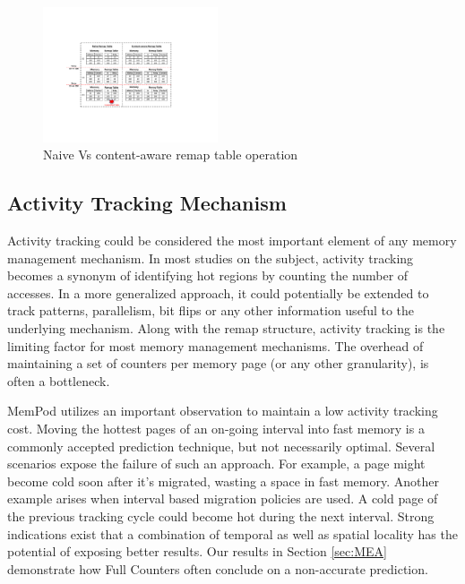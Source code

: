 \begin{figure}[h]
  \includegraphics[width=0.46\textwidth]{figures/remap_table_design.pdf}
  \caption{Naive Vs content-aware remap table operation}
  \label{fig:remap_table_comparison}
\end{figure}

%


\subsection{Activity Tracking Mechanism}
\label{sec:tracking}

Activity tracking could be considered the most important element of any memory management mechanism. In most studies on the subject, activity tracking becomes a synonym of identifying hot regions by counting the number of accesses. In a more generalized approach, it could potentially be extended to track patterns, parallelism, bit flips or any other information useful to the underlying mechanism. Along with the remap structure, activity tracking is the limiting factor for most memory management mechanisms. The overhead of maintaining a set of counters per memory page (or any other granularity), is often a bottleneck. 

MemPod utilizes an important observation to maintain a low activity tracking cost. Moving the hottest pages of an on-going interval into fast memory is a commonly accepted prediction technique, but not necessarily optimal. Several scenarios expose the failure of such an approach. For example, a page might become cold soon after it's migrated, wasting a space in fast memory. Another example arises when interval based migration policies are used. A cold page of the previous tracking cycle could become hot during the next interval. Strong indications exist that a combination of temporal as well as spatial locality has the potential of exposing better results. Our results in Section \ref{sec:MEA} demonstrate how Full Counters often conclude on a non-accurate prediction.


